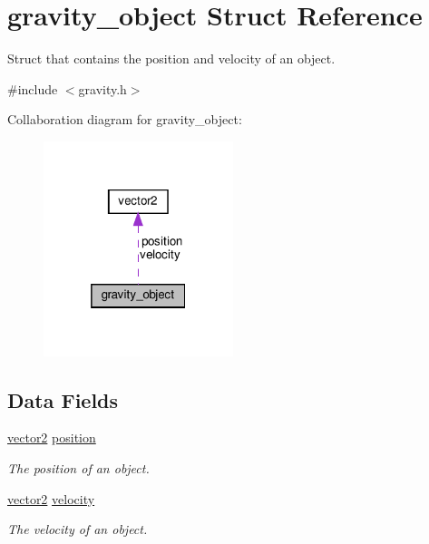 \hypertarget{structgravity__object}{}\section{gravity\+\_\+object Struct Reference}
\label{structgravity__object}


Struct that contains the position and velocity of an object.  




{\ttfamily \#include $<$gravity.\+h$>$}



Collaboration diagram for gravity\+\_\+object\+:\nopagebreak
\begin{figure}[H]
\begin{center}
\leavevmode
\includegraphics[width=157pt]{structgravity__object__coll__graph}
\end{center}
\end{figure}
\subsection*{Data Fields}
\begin{DoxyCompactItemize}
\item 
\hyperlink{structvector2}{vector2} \hyperlink{structgravity__object_a55d093fd989c09df2b1a0516b8828d31}{position}
\begin{DoxyCompactList}\small\item\em The position of an object. \end{DoxyCompactList}\item 
\hyperlink{structvector2}{vector2} \hyperlink{structgravity__object_ab38e0d342e3fc457159742966beadd5d}{velocity}
\begin{DoxyCompactList}\small\item\em The velocity of an object. \end{DoxyCompactList}\end{DoxyCompactItemize}


